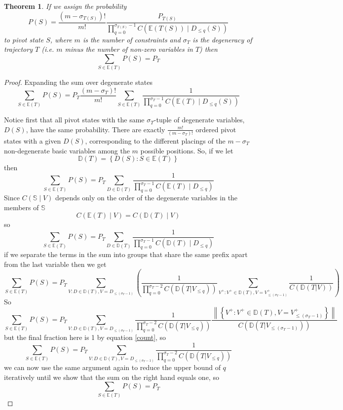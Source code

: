 \documentclass{article}
\newtheorem{theorem}{Theorem}
\begin{document}
\begin{theorem}
If we assign the probability
\begin{equation}
P(S) =  \frac{(m-\sigma_{T(S)})!}{m!} \frac{P_{T(S)}}{\prod_{q=0}^{\sigma_{T(S)}-1} C(\mathbb{E}(T(S)) \mid D_{\le q}(S))}
\label{pivotProb}
\end{equation}
to pivot state $S$, where $m$ is the number of constraints and $\sigma_{T}$ is the degeneracy of trajectory $T$ (i.e. $m$ minus the number of non-zero variables in $T$) then
\[
\sum_{S \in \mathbb{E}(T)} P(S) = P_{T}
\]
\end{theorem}
\begin{proof}
Expanding the sum over degenerate states
\[
\sum_{S \in \mathbb{E}(T)} P(S) =
P_T \frac{(m-\sigma_T)!}{m!} \sum_{S \in \mathbb{E}(T)} \frac{1}{\prod_{q=0}^{\sigma_T-1} C(\mathbb{E}(T) \mid D_{\le q}(S))}
\]

Notice first that all pivot states with the same $\sigma_T$-tuple of degenerate variables, $D(S)$, have the same probability. There are exactly $\frac{m!}{(m-\sigma_T)!}$ ordered pivot states with a given $D(S)$, corresponding to the different placings of the $m-\sigma_T$ non-degenerate basic variables among the $m$ possible positions. So, if we let
\[
\mathbb{D}(T) = \left\{ D(S) : S \in \mathbb{E}(T) \right\}
\]
then
\[
\sum_{S \in \mathbb{E}(T)} P(S) = P_T \sum_{D \in \mathbb{D}(T)} \frac{1}{\prod_{q=0}^{\sigma_T-1} C(\mathbb{E}(T) \mid D_{\le q})}
\]
Since $C(\mathbb{S} \mid V)$ depends only on the order of the degenerate variables in the members of $\mathbb{S}$
\[
C(\mathbb{E}(T) \mid V) = C(\mathbb{D}(T) \mid V)
\]
so
\begin{equation}
\sum_{S \in \mathbb{E}(T)} P(S) = P_T \sum_{D \in \mathbb{D}(T)} \frac{1}{\prod_{q=0}^{\sigma_T-1} C(\mathbb{D}(T) \mid D_{\le q})}
\label{normalForm}
\end{equation}
if we separate the terms in the sum into groups that share the same prefix apart from the last variable then we get
\[
\sum_{S \in \mathbb{E}(T)} P(S) = 
P_T \sum_{V : D \in \mathbb{D}(T), V = D_{\le (\sigma_T-1)}} 
\left(
\frac{1}{\prod_{q=0}^{\sigma_T-2} C(\mathbb{D}(T|V_{\le q}))}
\sum_{V^+: V^+ \in \mathbb{D}(T), V = V^+_{\le (\sigma_T-1)}}
\frac{1}{C(\mathbb{D}(T|V))}
\right)
\]
So
\[
\sum_{S \in \mathbb{E}(T)} P(S) = 
P_T \sum_{V : D \in \mathbb{D}(T), V = D_{\le (\sigma_T-1)}} 
\frac{1}{\prod_{q=0}^{\sigma_T-2} C(\mathbb{D}(T|V_{\le q}))}
\frac{\left\|\left\{V^+: V^+ \in \mathbb{D}(T), V = V^+_{\le (\sigma_T-1)}\right\}\right\|}{C(\mathbb{D}(T|V_{\le (\sigma_T-1)}))}
\]
but the final fraction here is 1 by equation \ref{count}, so
\[
\sum_{S \in \mathbb{E}(T)} P(S) = 
P_T \sum_{V : D \in \mathbb{D}(T), V = D_{\le (\sigma_T-1)}} 
\frac{1}{\prod_{q=0}^{\sigma_T-2} C(\mathbb{D}(T|V_{\le q}))}
\]
we can now use the same argument again to reduce the upper bound of $q$ iteratively until we show that the sum on the right hand equals one, so
\[
\sum_{S \in \mathbb{E}(T)} P(S) = P_T
\]
\end{proof}
\end{document}
